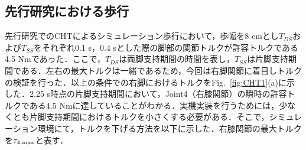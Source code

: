 \documentclass[twocolumn]{jsarticle}
\begin{document}
\subsection{先行研究における歩行}
先行研究でのCHTによるシミュレーション歩行において，歩幅を8 cmとし$T_{DS}$および$T_{SS}$をそれぞれ0.1 s，0.4 sとした際の脚部の関節トルクが許容トルクである4.5 Nmであった．ここで，$T_{DS}$は両脚支持期間の時間を表し，$T_{SS}$は片脚支持期間である．左右の最大トルクは一緒であるため，今回は右脚関節に着目しトルクの検証を行った．以上の条件での右脚におけるトルクをFig.~\ref{fig:CHT1}(a)に示した．2.25 s時点の片脚支持期間において，Joint4（右膝関節）の瞬時の許容トルクである4.5 Nmに達していることがわかる．実機実装を行うためには，少なくとも片脚支持期間におけるトルクを小さくする必要がある．そこで，シミュレーション環境にて，トルクを下げる方法を以下に示した．右膝関節の最大トルクを$\tau_{4,\rm{max}}$と表す．
    
\end{document}
